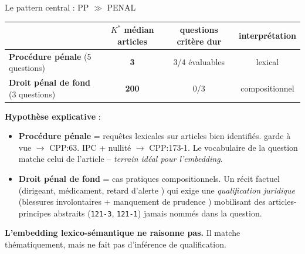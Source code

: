 \documentclass[aspectratio=169,10pt]{beamer}
\newcommand{\warnbox}[1]{%
  \begin{center}
  \colorbox{red!10}{\parbox{0.92\linewidth}{\centering #1}}
  \end{center}}
\begin{document}
\begin{frame}{Le pattern central : PP $\gg$ PENAL}
  \footnotesize
  \begin{tabular}{@{}l c c c@{}}
    \toprule
    & \textbf{$K^*$ médian articles} & \textbf{questions critère dur} & \textbf{interprétation} \\
    \midrule
    \textcolor{ppcol}{\textbf{Procédure pénale}} (5 questions) & \textbf{3} & 3/4 évaluables & \textcolor{ok}{lexical} \\
    \textcolor{penalcol}{\textbf{Droit pénal de fond}} (3 questions) & \textbf{200} & 0/3 & \textcolor{warn}{compositionnel} \\
    \bottomrule
  \end{tabular}

  \vspace{0.8em}
  \textbf{Hypothèse explicative} :

  \begin{itemize}\setlength\itemsep{0.3em}
    \item \textbf{Procédure pénale} = requêtes lexicales sur articles bien identifiés.
    \og garde à vue \fg{} $\to$ CPP:63. \og IPC + nullité \fg{} $\to$ CPP:173-1. Le
    vocabulaire de la question matche celui de l'article -- \emph{terrain idéal pour
    l'embedding}.
    \item \textbf{Droit pénal de fond} = cas pratiques compositionnels. Un récit
    factuel (\og dirigeant, médicament, retard d'alerte \fg{}) qui exige une
    \emph{qualification juridique} (\og blessures involontaires + manquement de
    prudence \fg{}) mobilisant des articles-principes abstraits (\texttt{121-3},
    \texttt{121-1}) jamais nommés dans la question.
  \end{itemize}

  \vspace{0.3em}
  \warnbox{\textbf{L'embedding lexico-sémantique ne raisonne pas.} Il matche
  thématiquement, mais ne fait pas d'inférence de qualification.}
\end{frame}
\end{document}
